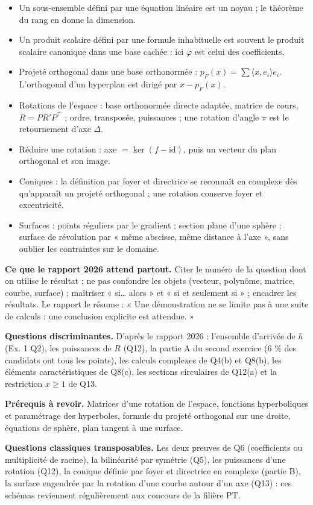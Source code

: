 \documentclass[11pt,a4paper]{article}
\providecommand{\tightlist}{\setlength{\itemsep}{0pt}\setlength{\parskip}{0pt}}
\begin{document}
\begin{itemize}
\tightlist
\item
  Un sous-ensemble défini par une équation linéaire est un noyau ; le théorème du rang en donne la dimension.
\item
  Un produit scalaire défini par une formule inhabituelle est souvent le produit scalaire canonique dans une base cachée : ici \(\varphi\) est celui des coefficients.
\item
  Projeté orthogonal dans une base orthonormée : \(p_F(x)=\sum\langle x,e_i\rangle e_i\). L'orthogonal d'un hyperplan est dirigé par \(x-p_F(x)\).
\item
  Rotations de l'espace : base orthonormée directe adaptée, matrice de cours, \(R=PR'P^\top\) ; ordre, transposée, puissances ; une rotation d'angle \(\pi\) est le retournement d'axe \(\Delta\).
\item
  Réduire une rotation : axe \(=\ker(f-\mathrm{id})\), puis un vecteur du plan orthogonal et son image.
\item
  Coniques : la définition par foyer et directrice se reconnaît en complexe dès qu'apparaît un projeté orthogonal ; une rotation conserve foyer et excentricité.
\item
  Surfaces : points réguliers par le gradient ; section plane d'une sphère ; surface de révolution par « même abscisse, même distance à l'axe », sans oublier les contraintes sur le domaine.
\end{itemize}

\textbf{Ce que le rapport 2026 attend partout.} Citer le numéro de la question dont on utilise le résultat ; ne pas confondre les objets (vecteur, polynôme, matrice, courbe, surface) ; maîtriser « si\ldots{} alors » et « si et seulement si » ; encadrer les résultats. Le rapport le résume : « Une démonstration ne se limite pas à une suite de calculs : une conclusion explicite est attendue. »

\textbf{Questions discriminantes.} D'après le rapport 2026 : l'ensemble d'arrivée de \(h\) (Ex. 1 Q2), les puissances de \(R\) (Q12), la partie A du second exercice (6 \% des candidats ont tous les points), les calculs complexes de Q4(b) et Q8(b), les éléments caractéristiques de Q8(c), les sections circulaires de Q12(a) et la restriction \(x\geqslant1\) de Q13.

\textbf{Prérequis à revoir.} Matrices d'une rotation de l'espace, fonctions hyperboliques et paramétrage des hyperboles, formule du projeté orthogonal sur une droite, équations de sphère, plan tangent à une surface.

\textbf{Questions classiques transposables.} Les deux preuves de Q6 (coefficients ou multiplicité de racine), la bilinéarité par symétrie (Q5), les puissances d'une rotation (Q12), la conique définie par foyer et directrice en complexe (partie B), la surface engendrée par la rotation d'une courbe autour d'un axe (Q13) : ces schémas reviennent régulièrement aux concours de la filière PT.
\end{document}
